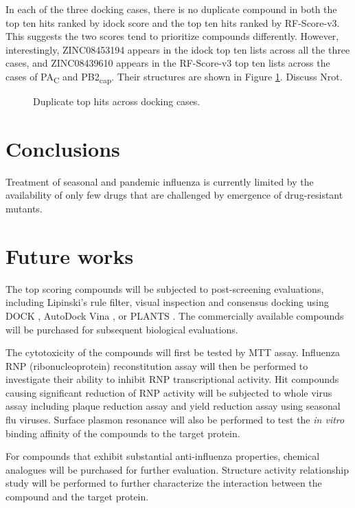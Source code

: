 In each of the three docking cases, there is no duplicate compound in both the top ten hits ranked by idock score and the top ten hits ranked by RF-Score-v3. This suggests the two scores tend to prioritize compounds differently. However, interestingly, ZINC08453194 appears in the idock top ten lists across all the three cases, and ZINC08439610 appears in the RF-Score-v3 top ten lists across the cases of PA\textsubscript{C} and PB2\textsubscript{cap}. Their structures are shown in Figure \ref{influenza:dup}. Discuss Nrot.

\begin{figure}
\centering
{}
\caption{Duplicate top hits across docking cases.}
\label{influenza:dup}
\end{figure}

\section{Conclusions}

Treatment of seasonal and pandemic influenza is currently limited by the availability of only few drugs that are challenged by emergence of drug-resistant mutants.

\section{Future works}

The top scoring compounds will be subjected to post-screening evaluations, including Lipinski's rule filter, visual inspection and consensus docking \citep{1590} using DOCK \citep{1222}, AutoDock Vina \citep{595}, or PLANTS \citep{610,607,779}. The commercially available compounds will be purchased for subsequent biological evaluations.

The cytotoxicity of the compounds will first be tested by MTT assay. Influenza RNP (ribonucleoprotein) reconstitution assay will then be performed to investigate their ability to inhibit RNP transcriptional activity. Hit compounds causing significant reduction of RNP activity will be subjected to whole virus assay including plaque reduction assay and yield reduction assay using seasonal flu viruses. Surface plasmon resonance will also be performed to test the \textit{in vitro} binding affinity of the compounds to the target protein. 

For compounds that exhibit substantial anti-influenza properties, chemical analogues will be purchased for further evaluation. Structure activity relationship study will be performed to further characterize the interaction between the compound and the target protein.

